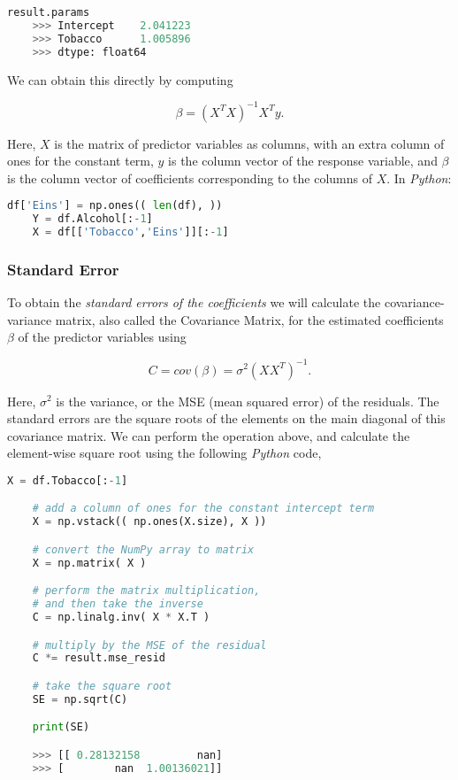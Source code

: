 \begin{lstlisting}[language=Python]
    result.params
    >>> Intercept    2.041223
    >>> Tobacco      1.005896
    >>> dtype: float64
\end{lstlisting}

We can obtain this directly by computing

\begin{equation}
    \beta = (X^{T}X)^{-1}X^{T}y.
\end{equation}

Here, $X$ is the matrix of predictor variables as columns, with an extra column of ones for the constant term, $y$ is the column vector of the response variable, and $\beta$ is the column vector of coefficients corresponding to the columns of $X$. In \emph{Python}:

\begin{lstlisting}[language=Python]
    df['Eins'] = np.ones(( len(df), ))
    Y = df.Alcohol[:-1]
    X = df[['Tobacco','Eins']][:-1]
\end{lstlisting}


\subsubsection{Standard Error}

To obtain the \emph{standard errors of the coefficients} we will calculate the covariance-variance matrix, also called the Covariance Matrix, for the estimated coefficients $\beta$ of the predictor variables using

\begin{equation}
    C = cov(\beta) = \sigma^{2} ( X X^{T} )^{-1}.
\end{equation}

Here, $\sigma^{2}$ is the variance, or the MSE (mean squared error) of the residuals. The standard errors are the square roots of the elements on the main diagonal of this covariance matrix. We can perform the operation above, and calculate the element-wise square root using the following \emph{Python} code,

\begin{lstlisting}[language=Python]
    X = df.Tobacco[:-1]

    # add a column of ones for the constant intercept term
    X = np.vstack(( np.ones(X.size), X ))

    # convert the NumPy array to matrix
    X = np.matrix( X )

    # perform the matrix multiplication,
    # and then take the inverse
    C = np.linalg.inv( X * X.T )

    # multiply by the MSE of the residual
    C *= result.mse_resid

    # take the square root
    SE = np.sqrt(C)

    print(SE)

    >>> [[ 0.28132158         nan]
    >>> [        nan  1.00136021]]

\end{lstlisting}

